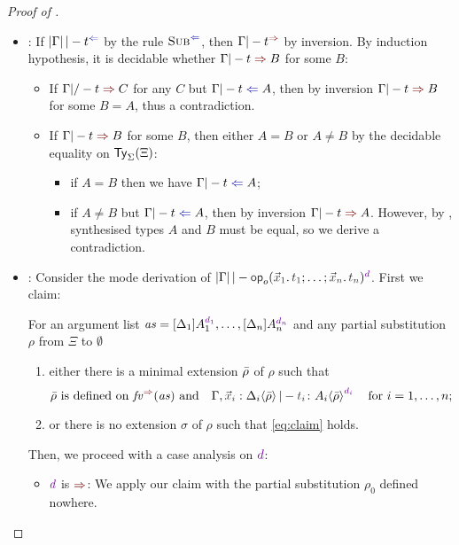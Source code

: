 \begin{proof}[Proof of {}]
\begin{itemize}
    \item {}: If $\erase{\Gamma} |-t^{\chk}$ by the rule $\ChkRule{Sub}$, then $\Gamma |- t^{\syn}$ by inversion.
      By induction hypothesis, it is decidable whether $\Gamma |- t \syn B$ for some $B$:
      \begin{itemize}
        \item If $\Gamma |/- t \syn C$ for any $C$ but $\Gamma |- t \chk A$, then by inversion $\Gamma |- t \syn B$ for some $B = A$, thus a contradiction.
        \item If $\Gamma |- t \syn B$ for some $B$, then either $A = B$ or $A \neq B$ by the decidable equality on $\mathsf{Ty}_{\Sigma}(\Xi)$: 
          \begin{itemize}
            \item if $A = B$ then we have\/ $\Gamma |- t \chk A$;
            \item if $A \neq B$ but $\Gamma |- t \chk A$, then by inversion $\Gamma |- t \syn A$.
              However, by , synthesised types $A$ and $B$ must be equal, so we derive a contradiction.
          \end{itemize}
      \end{itemize}
    \item {}:
      Consider the mode derivation of $\erase{\Gamma} |- \tmOpts^{\dir{d}}$.
      First we claim:
      \begin{claim}\label{lem:args-induction}
        For an argument list $\as = \biargs$ and any partial substitution $\rho$ from $\Xi$ to $\emptyset$
        \begin{enumerate}
          \item either there is a minimal extension $\bar{\rho}$ of $\rho$ such that 
            \begin{equation} \label{eq:claim}
              \text{$\ext{\rho}$ is defined on $\synvar(\as)$ and\/} \quad
              \Gamma, \vars{x}_\isTerm{i} : \simsub{\Delta_i}{\ext{\rho}} |- \isTerm{t_i} \colon \simsub{A_i}{\ext{\rho}}^{\dir{d_i}}
              \quad\text{for $i = 1, \ldots, n$};
            \end{equation}
          \item or there is no extension $\sigma$ of $\rho$ such that \eqref{eq:claim} holds.
        \end{enumerate}
      \end{claim}
      Then, we proceed with a case analysis on $\dir{d}$:
      \begin{itemize}
        \item $\dir{d}$ is $\syn$: We apply our claim with the partial substitution $\rho_0$ defined nowhere.

\end{itemize}
\end{itemize}
\end{proof}
